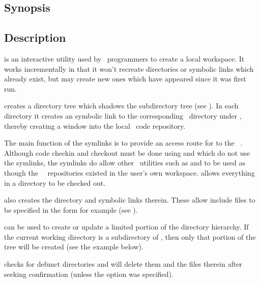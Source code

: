 \subsection*{Synopsis}

\begin{synopsis}
\end{synopsis}

\subsection*{Description}

 is an interactive utility used by \aipspp\ programmers to
create a local workspace.  It works incrementally in that it won't recreate
directories or symbolic links which already exist, but may create new ones
which have appeared since it was first run.

 creates a directory tree which shadows the 
subdirectory tree (see ).  In each directory it creates an
 symbolic link to the corresponding \rcs\ directory under
, thereby creating a window into the local \aipspp\ code
repository.

The main function of the  symlinks is to provide an access route for
 to the \aipspp\ .  Although code checkin and
checkout must be done using  and  which do not use the
 symlinks, the symlinks do allow other \rcs\ utilities such as
 and  to be used as though the \aipspp\ \rcs\ 
repositories existed in the user's own workspace.   allows
everything in a directory to be checked out.

 also creates the  directory and symbolic links
therein.  These allow include files to be specified in the form
 for example (see ).

 can be used to create or update a limited portion of the
directory hierarchy.  If the current working directory is a subdirectory of
\file{*/code}, then only that portion of the tree will be created (see the
example below).

 checks for defunct directories and will delete them and the files
therein after seeking confirmation (unless the \exe{-s} option was specified).

